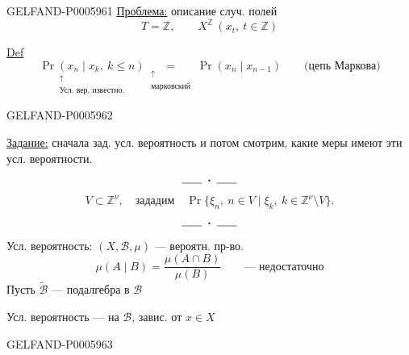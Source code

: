 \begin{GelfandAdjacentEvidence}{GELFAND-P000596}{1}
\underline{Проблема:} описание случ. полей
\[
T=\mathbb Z,\qquad X^{\mathbb Z}\ (x_t,\ t\in\mathbb Z)
\]

\underline{\underline{Def}}
\[
\underset{\substack{\uparrow\\\text{Усл. вер. известно.}}}{\Pr(x_n\mid x_k,\ k\le n)}
\underset{\substack{\uparrow\\\text{марковский}}}{=}
\Pr(x_n\mid x_{n-1})\qquad\text{(цепь Маркова)}
\]
\end{GelfandAdjacentEvidence}
\begin{GelfandAdjacentEvidence}{GELFAND-P000596}{2}


\underline{Задание:} сначала зад. усл. вероятность и потом смотрим, какие меры имеют эти усл. вероятности.
\[\rule{1.8em}{.4pt}\;\boldsymbol{\cdot}\;\rule{1.8em}{.4pt}\]
\[
V\subset\mathbb Z^\nu,\quad\text{зададим}\quad
\Pr\{\xi_n,\ n\in V\mid\xi_k,\ k\in\mathbb Z^\nu\setminus V\}.
\]
\[\rule{1.8em}{.4pt}\;\boldsymbol{\cdot}\;\rule{1.8em}{.4pt}\]
Усл. вероятность: \((X,\mathcal B,\mu)\) — вероятн. пр-во.
\[
\mu(A\mid B)=\frac{\mu(A\cap B)}{\mu(B)}
\qquad\text{— недостаточно}
\]
Пусть \(\widetilde{\mathcal B}\) — подалгебра в \(\mathcal B\)

Усл. вероятность —
на \(\mathcal B\), завис. от \(x\in X\)
\end{GelfandAdjacentEvidence}
\begin{GelfandAdjacentEvidence}{GELFAND-P000596}{3}

\end{GelfandAdjacentEvidence}

